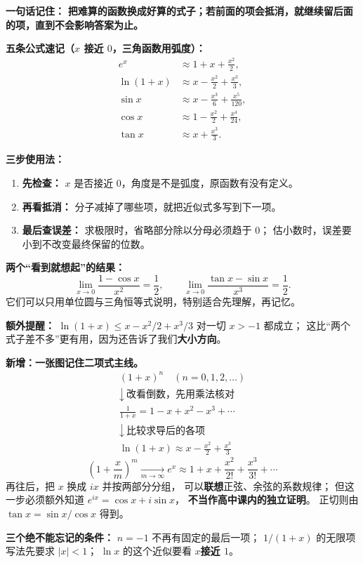 \clearpage
\begin{summarybox}
\textbf{一句话记住：}
\textbf{把难算的函数换成好算的式子；若前面的项会抵消，就继续留后面的项，直到不会影响答案为止。}

\textbf{五条公式速记（$x$ 接近 $0$，三角函数用弧度）：}
\[
\begin{aligned}
 e^x&\approx1+x+\frac{x^2}{2},\\
 \ln(1+x)&\approx x-\frac{x^2}{2}+\frac{x^3}{3},\\
 \sin x&\approx x-\frac{x^3}{6}+\frac{x^5}{120},\\
 \cos x&\approx1-\frac{x^2}{2}+\frac{x^4}{24},\\
 \tan x&\approx x+\frac{x^3}{3}.
\end{aligned}
\]

\textbf{三步使用法：}
\begin{enumerate}[leftmargin=*]
\item \textbf{先检查：} $x$ 是否接近 $0$，角度是不是弧度，原函数有没有定义。
\item \textbf{再看抵消：} 分子减掉了哪些项，就把近似式多写到下一项。
\item \textbf{最后查误差：} 求极限时，省略部分除以分母必须趋于 $0$；
估小数时，误差要小到不改变最终保留的位数。
\end{enumerate}

\textbf{两个“看到就想起”的结果：}
\[
 \lim_{x\to0}\frac{1-\cos x}{x^2}=\frac12,
 \qquad
 \lim_{x\to0}\frac{\tan x-\sin x}{x^3}=\frac12.
\]
它们可以只用单位圆与三角恒等式说明，特别适合先理解，再记忆。

\textbf{额外提醒：}
$\ln(1+x)\le x-x^2/2+x^3/3$ 对一切 $x>-1$ 都成立；
这比“两个式子差不多”更有用，因为还告诉了我们\textbf{大小方向}。

\medskip
\textbf{新增：一张图记住二项式主线。}
\[
 \boxed{\begin{gathered}
 (1+x)^n\quad(n=0,1,2,\ldots)\\
 \downarrow\ \text{改看倒数，先用乘法核对}\\
 \frac1{1+x}=1-x+x^2-x^3+\cdots\\
 \downarrow\ \text{比较求导后的各项}\\
 \ln(1+x)\approx x-\frac{x^2}{2}+\frac{x^3}{3}
 \end{gathered}}
\]
\[
 \boxed{\left(1+\frac{x}{m}\right)^m\xrightarrow[m\to\infty]{}
 e^x\approx1+x+\frac{x^2}{2!}+\frac{x^3}{3!}+\cdots}
\]
再往后，把 $x$ 换成 $ix$ 并按两部分分组，
可以\textbf{联想}正弦、余弦的系数规律；
但这一步必须额外知道 $e^{ix}=\cos x+i\sin x$，
\textbf{不当作高中课内的独立证明}。
正切则由 $\tan x=\sin x/\cos x$ 得到。

\textbf{三个绝不能忘记的条件：}
$n=-1$ 不再有固定的最后一项；
$1/(1+x)$ 的无限项写法先要求 $|x|<1$；
$\ln x$ 的这个近似要看 $x$\textbf{接近 $1$}。
\end{summarybox}
